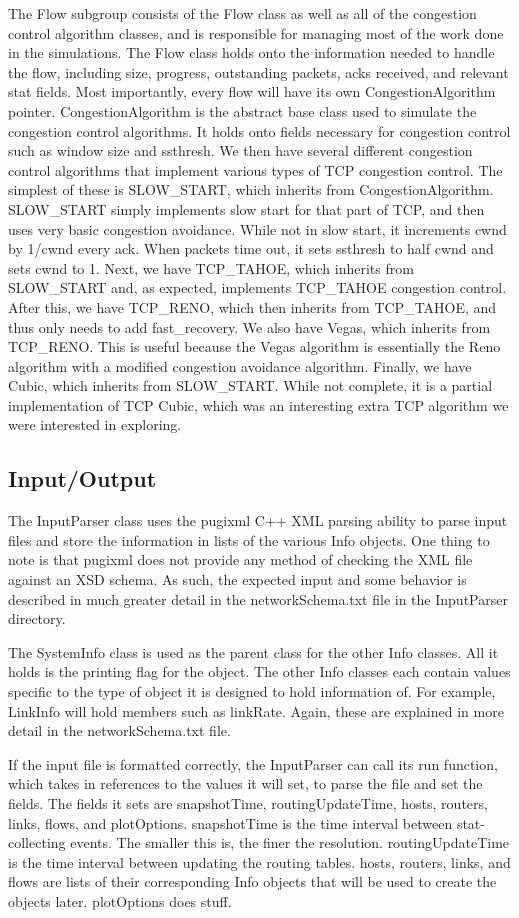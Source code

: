     The Flow subgroup consists of the Flow class as well as all of the congestion control algorithm classes, and is responsible for managing most of the work done in the simulations. The Flow class holds onto the information needed to handle the flow, including size, progress, outstanding packets, acks received, and relevant stat fields. Most importantly, every flow will have its own CongestionAlgorithm pointer. CongestionAlgorithm is the abstract base class used to simulate the congestion control algorithms. It holds onto fields necessary for congestion control such as window size and ssthresh. We then have several different congestion control algorithms that implement various types of TCP congestion control. The simplest of these is SLOW\_START, which inherits from CongestionAlgorithm. SLOW\_START simply implements slow start for that part of TCP, and then uses very basic congestion avoidance. While not in slow start, it increments cwnd by 1/cwnd every ack. When packets time out, it sets ssthresh to half cwnd and sets cwnd to 1. Next, we have TCP\_TAHOE, which inherits from SLOW\_START and, as expected, implements TCP\_TAHOE congestion control. After this, we have TCP\_RENO, which then inherits from TCP\_TAHOE, and thus only needs to add fast\_recovery. We also have Vegas, which inherits from TCP\_RENO. This is useful because the Vegas algorithm is essentially the Reno algorithm with a modified congestion avoidance algorithm. Finally, we have Cubic, which inherits from SLOW\_START. While not complete, it is a partial implementation of TCP Cubic, which was an interesting extra TCP algorithm we were interested in exploring.

\subsection{Input/Output}
    The InputParser class uses the pugixml C++ XML parsing ability to parse input files and store the information in lists of the various Info objects. One thing to note is that pugixml does not provide any method of checking the XML file against an XSD schema. As such, the expected input and some behavior is described in much greater detail in the networkSchema.txt file in the InputParser directory.
    
    The SystemInfo class is used as the parent class for the other Info classes. All it holds is the printing flag for the object. The other Info classes each contain values specific to the type of object it is designed to hold information of. For example, LinkInfo will hold members such as linkRate. Again, these are explained in more detail in the networkSchema.txt file.
    
If the input file is formatted correctly, the InputParser can call its run function, which takes in references to the values it will set, to parse the file and set the fields. The fields it sets are snapshotTime, routingUpdateTime, hosts, routers, links, flows, and plotOptions. snapshotTime is the time interval between stat-collecting events. The smaller this is, the finer the resolution. routingUpdateTime is the time interval between updating the routing tables. hosts, routers, links, and flows are lists of their corresponding Info objects that will be used to create the objects later. plotOptions does stuff.
